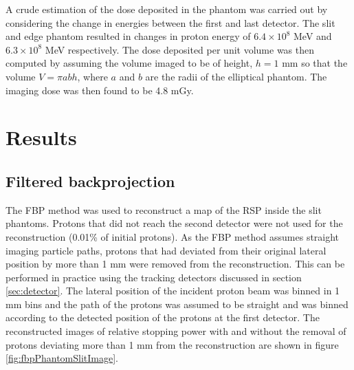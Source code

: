\documentclass[11pt,a4paper]{article}
\begin{document}
A crude estimation of the dose deposited in the phantom was carried out by considering the change in energies between the first and last detector. The slit and edge phantom resulted in changes in proton energy of $6.4 \times 10^8$ MeV and $6.3 \times 10^8$ MeV respectively. The dose deposited per unit volume was then computed by assuming the volume imaged to be of height, $h = 1$ mm so that the volume $V = \pi a b h$, where $a$ and $b$ are the radii of the elliptical phantom. The imaging dose was then found to be 4.8 mGy.

\section{Results}
\subsection{Filtered backprojection}
\label{sec:results}
The FBP method was used to reconstruct a map of the RSP inside the slit phantoms. Protons that did not reach the second detector were not used for the reconstruction (0.01\% of initial protons). As the FBP method assumes straight imaging particle paths, protons that had deviated from their original lateral position by more than 1 mm were removed from the reconstruction. This can be performed in practice using the tracking detectors discussed in section \ref{sec:detector}. The lateral position of the incident proton beam was binned in 1 mm bins and the path of the protons was assumed to be straight and was binned according to the detected position of the protons at the first detector. The reconstructed images of relative stopping power with and without the removal of protons deviating more than 1 mm from the reconstruction are shown in figure \ref{fig:fbpPhantomSlitImage}.
\end{document}
